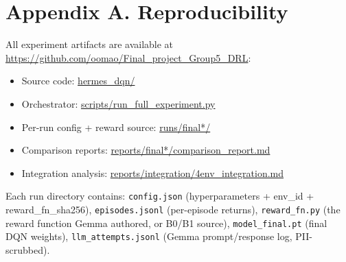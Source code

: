 \documentclass[conference,letterpaper,10pt]{IEEEtran}
\providecommand{\tightlist}{\setlength{\itemsep}{0pt}\setlength{\parskip}{0pt}}
\begin{document}
\section*{Appendix A. Reproducibility}

All experiment artifacts are available at \url{https://github.com/oomao/Final_project_Group5_DRL}:

\begin{itemize}
\tightlist
\item
  Source code: \url{hermes_dqn/}
\item
  Orchestrator: \url{scripts/run_full_experiment.py}
\item
  Per-run config + reward source: \url{runs/final*/}
\item
  Comparison reports: \url{reports/final*/comparison_report.md}
\item
  Integration analysis: \url{reports/integration/4env_integration.md}
\end{itemize}

Each run directory contains: \texttt{config.json} (hyperparameters + env\_id + reward\_fn\_sha256), \texttt{episodes.jsonl} (per-episode returns), \texttt{reward\_fn.py} (the reward function Gemma authored, or B0/B1 source), \texttt{model\_final.pt} (final DQN weights), \texttt{llm\_attempts.jsonl} (Gemma prompt/response log, PII-scrubbed).
\end{document}
